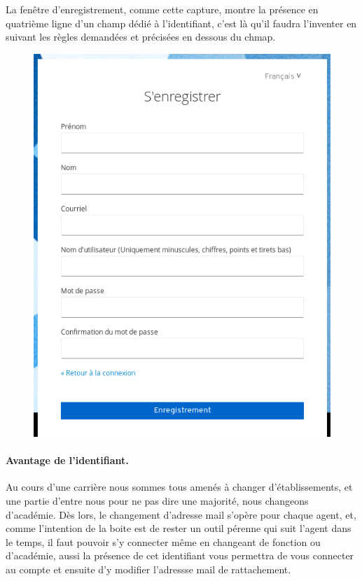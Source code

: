 \documentclass[a4paper, 11pt]{book}
\begin{document}
La fenêtre d'enregistrement, comme cette capture, montre la présence en quatrième ligne d'un champ dédié à l'identifiant, c'est là qu'il faudra l'inventer en suivant les règles demandées et précisées en dessous du chmap.
\begin{figure}
	\centering
	\includegraphics{./Captures/portail.site.web.enregistrement.png}
	\caption{}
\end{figure}

\paragraph{Avantage de l'identifiant.} Au cours d'une carrière nous sommes tous amenés à changer d'établissements, et une partie d'entre nous pour ne pas dire une majorité, nous changeons d'académie. 
Dès lors, le changement d'adresse mail s'opère pour chaque agent, et, comme l'intention de la boite est de rester un outil pérenne qui suit l'agent dans le temps, il faut pouvoir s'y connecter même en changeant de fonction ou d'académie, aussi la présence de cet identifiant vous permettra de vous connecter au compte et ensuite d'y modifier l'adressse mail de rattachement.
\end{document}
